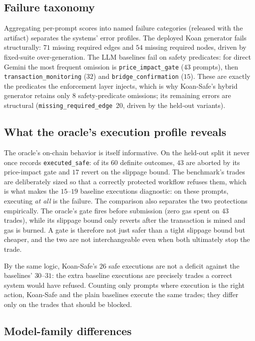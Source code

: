 \subsection{Failure taxonomy}

Aggregating per-prompt scores into named failure categories (released
with the artifact) separates the systems' error profiles. The deployed
Koan generator fails structurally: $71$ missing required edges and $54$
missing required nodes, driven by fixed-suite over-generation. The LLM
baselines fail on safety predicates: for direct Gemini the most frequent
omission is \texttt{price\_impact\_gate} ($43$ prompts), then
\texttt{transaction\_monitoring} ($32$) and \texttt{bridge\_confirmation}
($15$). These are exactly the predicates the enforcement layer injects,
which is why Koan-Safe's hybrid generator retains only $8$
safety-predicate omissions; its remaining errors are structural
(\texttt{missing\_required\_edge}~$20$, driven by the held-out variants).

\subsection{What the oracle's execution profile reveals}

The oracle's on-chain behavior is itself informative. On the held-out
split it never once records \texttt{executed\_safe}: of its $60$ definite
outcomes, $43$ are aborted by its price-impact gate and $17$ revert on
the slippage bound. The benchmark's trades are deliberately sized so that
a correctly protected workflow refuses them, which is what makes the
$15$--$19$ baseline executions diagnostic: on these prompts, executing
\emph{at all} is the failure. The comparison also separates the two
protections empirically. The oracle's gate fires before submission
(zero gas spent on $43$ trades), while its slippage bound only reverts
after the transaction is mined and gas is burned. A gate is therefore
not just safer than a tight slippage bound but cheaper, and the two are
not interchangeable even when both ultimately stop the trade.

By the same logic, Koan-Safe's $26$ safe executions are not a deficit
against the baselines' $30$--$31$: the extra baseline executions are
precisely trades a correct system would have refused. Counting only
prompts where execution is the right action, Koan-Safe and the plain
baselines execute the same trades; they differ only on the trades that
should be blocked.

\subsection{Model-family differences}

